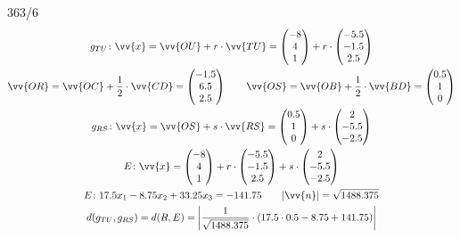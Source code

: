 \begin{exercise}{363/6}
\begin{gather*}
    g_{TU} \colon \vv{x} = \vv{OU} + r \cdot \vv{TU} = \begin{pmatrix}-8 \\ 4 \\ 1\end{pmatrix} + r \cdot \begin{pmatrix}-5.5 \\ -1.5 \\ 2.5\end{pmatrix} \\
    \vv{OR} = \vv{OC} + \frac{1}{2} \cdot \vv{CD} = \begin{pmatrix}-1.5 \\ 6.5 \\ 2.5\end{pmatrix} \qquad \vv{OS} = \vv{OB} + \frac{1}{2} \cdot \vv{BD} = \begin{pmatrix}0.5 \\ 1 \\ 0\end{pmatrix} \\
    g_{RS} \colon \vv{x} = \vv{OS} + s \cdot \vv{RS} = \begin{pmatrix}0.5 \\ 1 \\ 0\end{pmatrix} + s \cdot \begin{pmatrix}2 \\ -5.5 \\ -2.5\end{pmatrix} \\
    E \colon \vv{x} = \begin{pmatrix}-8 \\ 4 \\ 1\end{pmatrix} + r \cdot \begin{pmatrix}-5.5 \\ -1.5 \\ 2.5\end{pmatrix} + s \cdot \begin{pmatrix}2 \\ -5.5 \\ -2.5\end{pmatrix} \\
    E \colon 17.5x_1 - 8.75x_2 + 33.25x_3 = -141.75 \qquad |\vv{n}| = \sqrt{1488.375} \\
    d(g_{TU}, g_{RS}) = d(R, E) = \left|\frac{1}{\sqrt{1488.375}} \cdot (17.5 \cdot 0.5 - 8.75 + 141.75)\right|
  \end{gather*}
\end{exercise}
